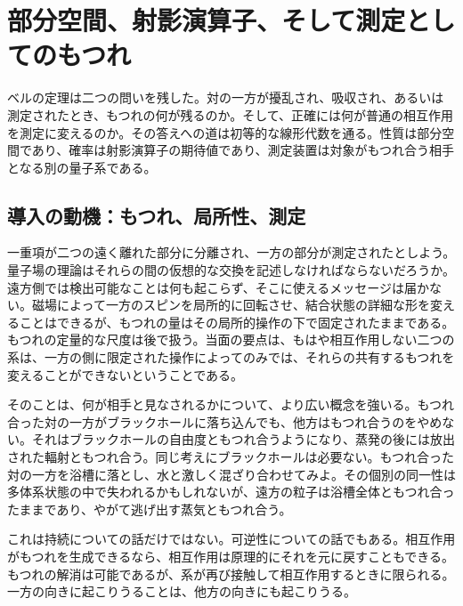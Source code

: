 \chapter{部分空間、射影演算子、そして測定としてのもつれ}

ベルの定理は二つの問いを残した。対の一方が擾乱され、吸収され、あるいは測定されたとき、もつれの何が残るのか。そして、正確には何が普通の相互作用を測定に変えるのか。その答えへの道は初等的な線形代数を通る。性質は部分空間であり、確率は射影演算子の期待値であり、測定装置は対象がもつれ合う相手となる別の量子系である。

\section{導入の動機：もつれ、局所性、測定}

一重項が二つの遠く離れた部分に分離され、一方の部分が測定されたとしよう。量子場の理論はそれらの間の仮想的な交換を記述しなければならないだろうか。遠方側では検出可能なことは何も起こらず、そこに使えるメッセージは届かない。磁場によって一方のスピンを局所的に回転させ、結合状態の詳細な形を変えることはできるが、もつれの量はその局所的操作の下で固定されたままである。もつれの定量的な尺度は後で扱う。当面の要点は、もはや相互作用しない二つの系は、一方の側に限定された操作によってのみでは、それらの共有するもつれを変えることができないということである。

\begin{classroomqa}
\end{classroomqa}

そのことは、何が相手と見なされるかについて、より広い概念を強いる。もつれ合った対の一方がブラックホールに落ち込んでも、他方はもつれ合うのをやめない。それはブラックホールの自由度ともつれ合うようになり、蒸発の後には放出された輻射ともつれ合う。同じ考えにブラックホールは必要ない。もつれ合った対の一方を浴槽に落とし、水と激しく混ざり合わせてみよ。その個別の同一性は多体系状態の中で失われるかもしれないが、遠方の粒子は浴槽全体ともつれ合ったままであり、やがて逃げ出す蒸気ともつれ合う。

これは持続についての話だけではない。可逆性についての話でもある。相互作用がもつれを生成できるなら、相互作用は原理的にそれを元に戻すこともできる。もつれの解消は可能であるが、系が再び接触して相互作用するときに限られる。一方の向きに起こりうることは、他方の向きにも起こりうる。

